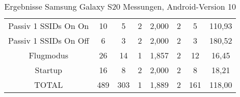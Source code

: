 \begin{landscape}
\begin{table}[h!]
\begin{tabular}{|c|c|c|c|c|c|c|c|}
      Passiv 1 SSIDs On On & \phantom{0}10 & \phantom{00}5 & 2 & 2,000 & 2 & \phantom{00}5 & 110,93 \\
      Passiv 1 SSIDs On Off & \phantom{00}6 & \phantom{00}3 & 2 & 2,000 & 2 & \phantom{00}3 & 180,52 \\
      Flugmodus & \phantom{0}26 & \phantom{0}14 & 1 & 1,857 & 2 & \phantom{0}12 & \phantom{0}16,45 \\
      Startup & \phantom{0}16 & \phantom{00}8 & 2 & 2,000 & 2 & \phantom{00}8 & \phantom{0}18,21 \\
      \hline
      TOTAL & 489 & 303 & 1 & 1,889 & 2 & 161 & 118,00 \\
      \hline
      \end{tabular}
      \caption{Ergebnisse Samsung Galaxy S20 Messungen, Android-Version 10
      \label{table:samsunggalaxys20-10-results}} 
   \end{table}

   \clearpage


\end{landscape}
